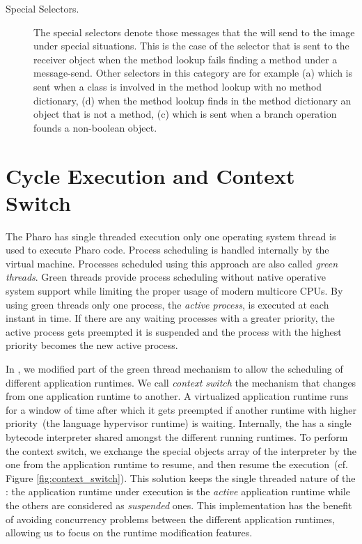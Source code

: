 \begin{description}
\item[Special Selectors.] The special selectors denote those messages that the \VM will send to the image under special situations. This is the case of the  selector that is sent to the receiver object when the method lookup fails finding a method under a message-send. Other selectors in this category are for example (a)  which is sent when a class is involved in the method lookup with no method dictionary, (d)  when the method lookup finds in the method dictionary an object that is not a method, (c)  which is sent when a branch operation founds a non-boolean object.

\end{description}




\section{Cycle Execution and Context Switch} \label{sec:context_switch}

The Pharo \VM has single threaded execution \ie only one operating system thread is used to execute Pharo code. Process scheduling is handled internally by the virtual machine. Processes scheduled using this approach are also called \emph{green threads}. Green threads provide process scheduling without native operative system support while limiting the proper usage of modern multicore CPUs. By using green threads only one process, the \emph{active process}, is executed at each instant in time. If there are any waiting processes with a greater priority, the active process gets preempted \ie it is suspended and the process with the highest priority becomes the new active process.

In \Vtt, we modified part of the green thread mechanism to allow the scheduling of different application runtimes. We call \emph{context switch} the mechanism that changes from one application runtime to another. A virtualized application runtime runs for a window of time after which it gets preempted if another runtime with higher priority~(the language hypervisor runtime) is waiting. Internally, the \VM has a single bytecode interpreter shared amongst the different running runtimes. To perform the context switch, we exchange the special objects array of the \VM interpreter by the one from the application runtime to resume, and then resume the \VM execution~(cf. Figure \ref{fig:context_switch}). This solution keeps the single threaded nature of the \VM: the application runtime under execution is the \emph{active} application runtime while the others are considered as \emph{suspended} ones. This implementation has the benefit of avoiding concurrency problems between the different application runtimes, allowing us to focus on the runtime modification features.

